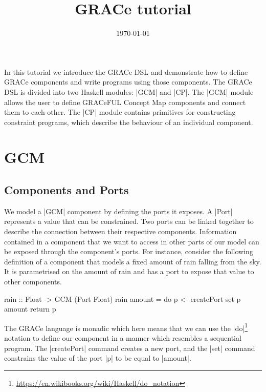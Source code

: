 \documentclass[a4paper]{article}
\title{GRACe tutorial}
\author{}
\date{\today}
\begin{document}
\maketitle


\noindent
In this tutorial we introduce the GRACe DSL and demonstrate how to define GRACe
components and write programs using those components. The GRACe DSL is divided
into two Haskell modules: |GCM| and |CP|. The |GCM| module allows the user to
define GRACeFUL Concept Map components and connect them to each other. The |CP|
module contains primitives for constructing constraint programs, which describe
the behaviour of an individual component.


\section{GCM}
\subsection{Components and Ports}

We model a |GCM| component by defining the ports it exposes. A |Port| represents
a value that can be constrained. Two ports can be linked together to describe
the connection between their respective components. Information contained in a
component that we want to access in other parts of our model can be exposed
through the component's ports. For instance, consider the following definition
of a component that models a fixed amount of rain falling from the sky.  It is
parametrised on the amount of rain and has a port to expose that value to other
components.
\begin{haskellcode}
rain :: Float -> GCM (Port Float)
rain amount = do
  p <- createPort
  set p amount
  return p
\end{haskellcode}
The GRACe language is monadic which here means that we can use the
|do|\footnote{\url{https://en.wikibooks.org/wiki/Haskell/do_notation}}
notation to define our component in a manner which resembles a
sequential program. The |createPort| command creates a new port, and
the |set| command constrains the value of the port |p| to be equal to
|amount|.
\end{document}
